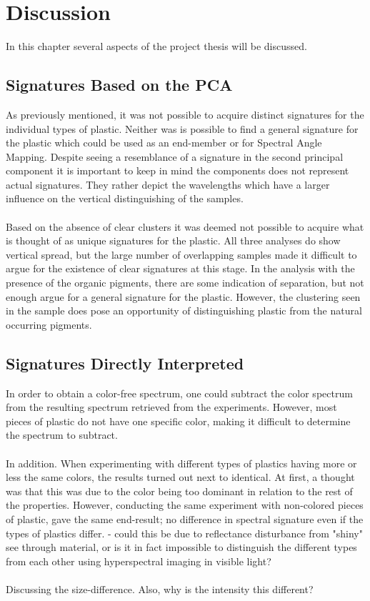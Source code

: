 \chapter{Discussion}
\label{chap:discussion}
 In this chapter several aspects of the project thesis will be discussed.
 
 
\section{Signatures Based on the PCA}
As previously mentioned, it was not possible to acquire distinct signatures for the individual types of plastic. Neither was is possible to find a general signature for the plastic which could be used as an end-member or for Spectral Angle Mapping. Despite seeing a resemblance of a signature in the second principal component it is important to keep in mind the components does not represent actual signatures. They rather depict the wavelengths which have a larger influence on the vertical distinguishing of the samples.
\\\\
Based on the absence of clear clusters it was deemed not possible to acquire what is thought of as unique signatures for the plastic. All three analyses do show vertical spread, but the large number of overlapping samples made it difficult to argue for the existence of clear signatures at this stage. In the analysis with the presence of the organic pigments, there are some indication of separation, but not enough argue for a general signature for the plastic. However, the clustering seen in the sample does pose an opportunity of distinguishing plastic from the natural occurring pigments. 
 
\section{Signatures Directly Interpreted}
In order to obtain a color-free spectrum, one could subtract the color spectrum from the resulting spectrum retrieved from the experiments. However, most pieces of plastic do not have one specific color, making it difficult to determine the spectrum to subtract. 
\\\\
In addition. When experimenting with different types of plastics having more or less the same colors, the results turned out next to identical. At first, a thought was that this was due to the color being too dominant in relation to the rest of the properties. However, conducting the same experiment with non-colored pieces of plastic, gave the same end-result; no difference in spectral signature even if the types of plastics differ. - could this be due to reflectance disturbance from "shiny" see through material, or is it in fact impossible to distinguish the different types from each other using hyperspectral imaging in visible light?
\\\\
Discussing the size-difference. Also, why is the intensity this different?
 
